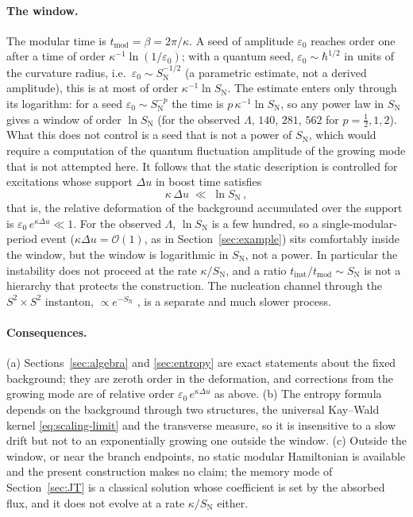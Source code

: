 \documentclass[11pt]{article}
\begin{document}
\paragraph{The window.} The modular time is $t_{\mathrm{mod}}=\beta=2\pi/\kappa$. A seed of amplitude $\varepsilon_0$ reaches order one after a time of order $\kappa^{-1}\ln(1/\varepsilon_0)$; with a quantum seed, $\varepsilon_0\sim \hbar^{1/2}$ in units of the curvature radius, i.e.\ $\varepsilon_0\sim S_{\mathrm N}^{-1/2}$ (a parametric estimate, not a derived amplitude), this is at most of order $\kappa^{-1}\ln S_{\mathrm N}$. The estimate enters only through its logarithm: for a seed $\varepsilon_0\sim S_{\mathrm N}^{-p}$ the time is $p\,\kappa^{-1}\ln S_{\mathrm N}$, so any power law in $S_{\mathrm N}$ gives a window of order $\ln S_{\mathrm N}$ (for the observed $\Lambda$, $140$, $281$, $562$ for $p=\tfrac12,1,2$). What this does not control is a seed that is not a power of $S_{\mathrm N}$, which would require a computation of the quantum fluctuation amplitude of the growing mode that is not attempted here. It follows that the static description is controlled for excitations whose support $\Delta u$ in boost time satisfies
\begin{equation}
\kappa\,\Delta u \;\ll\; \ln S_{\mathrm N}\,,
\label{eq:hierarchy}
\end{equation}
that is, the relative deformation of the background accumulated over the support is $\varepsilon_0\,e^{\kappa\Delta u}\ll1$. For the observed $\Lambda$, $\ln S_{\mathrm N}$ is a few hundred, so a single-modular-period event ($\kappa\Delta u=\mathcal O(1)$, as in Section~\ref{sec:example}) sits comfortably inside the window, but the window is logarithmic in $S_{\mathrm N}$, not a power. In particular the instability does not proceed at the rate $\kappa/S_{\mathrm N}$, and a ratio $t_{\mathrm{inst}}/t_{\mathrm{mod}}\sim S_{\mathrm N}$ is not a hierarchy that protects the construction. The nucleation channel through the $S^2\times S^2$ instanton, $\propto e^{-S_{\mathrm N}}$ \cite{GinspargPerry}, is a separate and much slower process.

\paragraph{Consequences.} (a) Sections~\ref{sec:algebra} and \ref{sec:entropy} are exact statements about the fixed background; they are zeroth order in the deformation, and corrections from the growing mode are of relative order $\varepsilon_0\,e^{\kappa\Delta u}$ as above. (b) The entropy formula depends on the background through two structures, the universal Kay--Wald kernel \eqref{eq:scaling-limit} and the transverse measure, so it is insensitive to a slow drift but not to an exponentially growing one outside the window. (c) Outside the window, or near the branch endpoints, no static modular Hamiltonian is available and the present construction makes no claim; the memory mode of Section~\ref{sec:JT} is a classical solution whose coefficient is set by the absorbed flux, and it does not evolve at a rate $\kappa/S_{\mathrm N}$ either.
\end{document}
